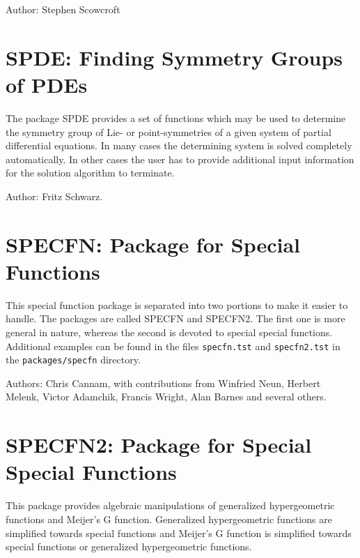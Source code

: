 Author: Stephen Scowcroft



\newpage

\section{SPDE: Finding Symmetry Groups of PDEs}

\label{package:SPDE}

The package SPDE provides a set of functions which may be used to
determine the symmetry group of Lie- or point-symmetries of a given system
of partial differential equations. In many cases the determining system is
solved completely automatically. In other cases the user has to provide
additional input information for the solution algorithm to terminate.

Author: Fritz Schwarz.



\newpage

\section{SPECFN: Package for Special Functions}

This special function package is separated into two portions to make
it easier to handle.  The packages are called SPECFN and SPECFN2.  The
first one is more general in nature, whereas the second is devoted to
special special functions.  Additional examples can
be found in the files \texttt{specfn.tst} and
\texttt{specfn2.tst} in the \texttt{packages/specfn} directory.

Authors:  Chris Cannam, with contributions from Winfried Neun, Herbert
Melenk, Victor Adamchik, Francis Wright, Alan Barnes and several others.



\section{SPECFN2: Package for Special Special Functions}


This package provides algebraic manipulations of generalized
hypergeometric functions and Meijer's G function.  Generalized
hypergeometric functions are simplified towards special functions and
Meijer's G function is simplified towards special functions or generalized
hypergeometric functions.

